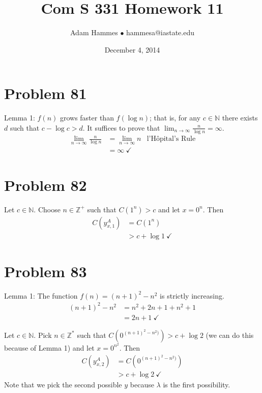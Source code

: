 \documentclass[11pt]{article}
\let\imp\rightarrow
\begin{document}
\title{Com S 331 Homework 11}
\author{Adam Hammes $\bullet$ hammesa@iastate.edu}
\date{December 4, 2014}
\maketitle


\section*{Problem 81}

Lemma 1: $f(n)$ grows faster than $f( \log n)$; that is, for any $c \in \mathbb{N}$ there exists $d$ such that $c - \log c > d$. 
It suffices to prove that $\lim _{n \imp \infty} \frac{n}{\log n}= \infty$.
	\begin{align*}
		\lim _{n \imp \infty} \frac{n}{\log n}  &= \lim _{n \imp \infty} n &\text{l'H\^{o}pital's Rule} \\
		&= \infty \ \checkmark
	\end{align*}


\section*{Problem 82}

Let $c \in \mathbb{N}$. Choose $n \in \mathbb{Z}^+$ such that $C(1^n) > c$ and let $x = 0^n$.
Then
	\begin{align*}
		C(y_{x,1} ^A) &= C(1^n) \\
		&> c + \log 1 \ \checkmark
	\end{align*}


\section*{Problem 83}

Lemma 1: The function $f(n) = (n+1)^2 - n^2$ is strictly increasing.
	\begin{align*}
		(n+1)^2 - n^2 &= n^2 + 2n + 1 + n^2 + 1 \\
		&= 2n +1 \ \checkmark
	\end{align*}

Let $c \in \mathbb{N}$.
Pick $n \in \mathbb{Z^*}$ such that $C( 0^{(n+1)^2 - n^2)}) > c + \log 2$ (we can do this because of Lemma 1) and let $x= 0^{n^2}$.
Then
	\begin{align*}
		C(y _{x, 2} ^A) &= C( 0^{(n+1)^2 - n^2)}) \\
		&> c + \log 2 \ \checkmark
	\end{align*}
Note that we pick the second possible $y$ because $\lambda$ is the first possibility.
\end{document}
